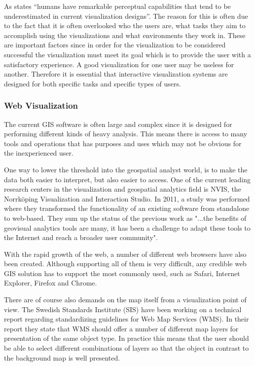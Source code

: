 \documentclass[a4paper,12pt,titlepage]{article}
\begin{document}
As \citet{UserCenterApproach} states “humans have remarkable perceptual capabilities that tend to be underestimated in current visualization designs”. The reason for this is often due to the fact that it is often overlooked  who the users are, what tasks they aim to accomplish using the visualizations and what environments they work in. These are important factors since in order for the visualization to be considered successful the visualization must meet its goal which is to provide the user with a satisfactory experience. A good visualization for one user may be useless for another. Therefore it is essential that interactive visualization systems are designed for both specific tasks and specific types of users. \citep{UserCenterApproach}



\subsubsection{Web Visualization}
The current GIS software is often large and complex since it is designed for performing different kinds of heavy analysis. This means there is access to many tools and operations that has purposes and uses which may not be obvious for the inexperienced user. %

One way to lower the threshold into the geospatial analyst world, is to make the data both easier to interpret, but also easier to access. One of the current leading research centers in the visualization and geospatial analytics field is NVIS, the Norrköping Visualization and Interaction Studio. In 2011, a study was performed where they transformed the functionality of an existing software from standalone to web-based. They sum up the status of the previous work as "...the benefits of geovisual analytics tools are many, it has been a challenge to adapt these tools to the Internet and reach a broader user community". \citep{WebEnabled} 

With  the rapid growth of the web, a number of different web browsers have also been created. Although supporting all of them is very difficult, any credible web GIS solution has to support the most commonly used, such as Safari, Internet Explorer, Firefox and Chrome. \citep{webGIS} 

There are of course also demands on the map itself from a visualization point of view. The Swedish Standards Institute (SIS) have been working on a technical report regarding standardizing guidelines for Web Map Services (WMS). In their report they state that WMS should offer a number of different map layers for presentation of the same object type. In practice this means that the user should be able to select different combinations of layers so that the object in contrast to the background map is well presented. 
\citep{SSIReport}
\end{document}
